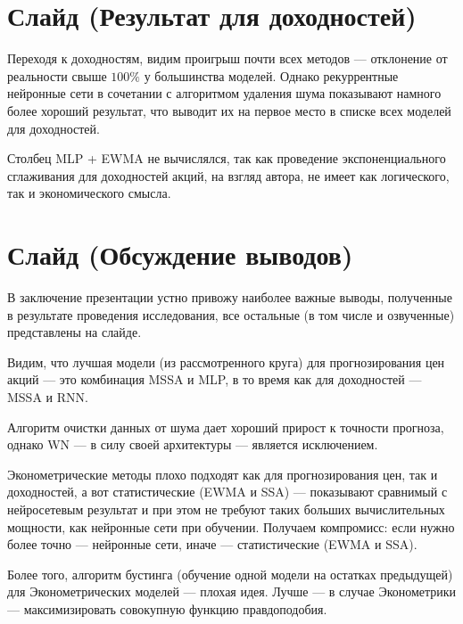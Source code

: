 \documentclass[a4paper, 12pt]{article}
\begin{document}
	\section{Слайд (Результат для доходностей)}
		Переходя к доходностям, видим проигрыш почти всех методов --- отклонение от реальности свыше $100\%$ у большинства моделей. Однако рекуррентные нейронные сети в сочетании с алгоритмом удаления шума показывают намного более хороший результат, что выводит их на первое место в списке всех моделей для доходностей.
		
		Столбец MLP + EWMA не вычислялся, так как проведение экспоненциального сглаживания для доходностей акций, на взгляд автора, не имеет как логического, так и экономического смысла.
	\section{Слайд (Обсуждение выводов)}
		В заключение презентации устно привожу наиболее важные выводы, полученные в результате проведения исследования, все остальные (в том числе и озвученные) представлены на слайде. 
		
		Видим, что лучшая модели (из рассмотренного круга) для прогнозирования цен акций --- это комбинация MSSA и MLP, в то время как для доходностей --- MSSA и RNN.
		
		Алгоритм очистки данных от шума дает хороший прирост к точности прогноза, однако WN --- в силу своей архитектуры --- является исключением.
		
		Эконометрические методы плохо подходят как для прогнозирования цен, так и доходностей, а вот статистические (EWMA и SSA) --- показывают сравнимый с нейросетевым результат и при этом не требуют таких больших вычислительных мощности, как нейронные сети при обучении. Получаем компромисс: если нужно более точно --- нейронные сети, иначе --- статистические (EWMA и SSA).
		
		Более того, алгоритм бустинга (обучение одной модели на остатках предыдущей) для Эконометрических моделей --- плохая идея. Лучше --- в случае Эконометрики --- максимизировать совокупную функцию правдоподобия.
\end{document}
